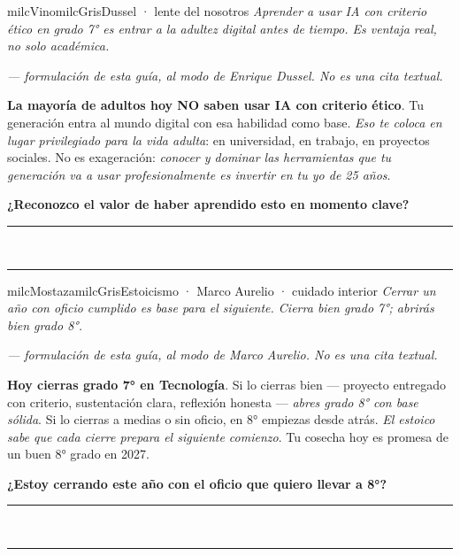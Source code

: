 \documentclass[11pt,letterpaper]{article}
\newcommand{\linead}[1]{\noindent\color{milcLinea}\rule{#1}{0.5pt}\color{milcNegro}}
\begin{document}
\begin{softbox}{milcVino}{milcGris}{Dussel · lente del nosotros}
\textit{Aprender a usar IA con criterio ético en grado 7° es entrar a la adultez digital antes de tiempo. Es ventaja real, no solo académica.}

{\footnotesize\itshape\color{milcNegro!70}--- formulación de esta guía, al modo de Enrique Dussel. No es una cita textual.}

\textbf{La mayoría de adultos hoy NO saben usar IA con criterio ético}. Tu generación entra al mundo digital con esa habilidad como base. \emph{Eso te coloca en lugar privilegiado para la vida adulta}: en universidad, en trabajo, en proyectos sociales. No es exageración: \emph{conocer y dominar las herramientas que tu generación va a usar profesionalmente es invertir en tu yo de 25 años}.

\textbf{¿Reconozco el valor de haber aprendido esto en momento clave?}
\end{softbox}
\linead{\linewidth}\\[1mm]
\linead{\linewidth}

\begin{softbox}{milcMostaza}{milcGris}{Estoicismo · Marco Aurelio · cuidado interior}
\textit{Cerrar un año con oficio cumplido es base para el siguiente. Cierra bien grado 7°; abrirás bien grado 8°.}

{\footnotesize\itshape\color{milcNegro!70}--- formulación de esta guía, al modo de Marco Aurelio. No es una cita textual.}

\textbf{Hoy cierras grado 7° en Tecnología}. Si lo cierras bien --- proyecto entregado con criterio, sustentación clara, reflexión honesta --- \emph{abres grado 8° con base sólida}. Si lo cierras a medias o sin oficio, en 8° empiezas desde atrás. \emph{El estoico sabe que cada cierre prepara el siguiente comienzo}. Tu cosecha hoy es promesa de un buen 8° grado en 2027.

\textbf{¿Estoy cerrando este año con el oficio que quiero llevar a 8°?}
\end{softbox}
\linead{\linewidth}\\[1mm]
\linead{\linewidth}
\end{document}
